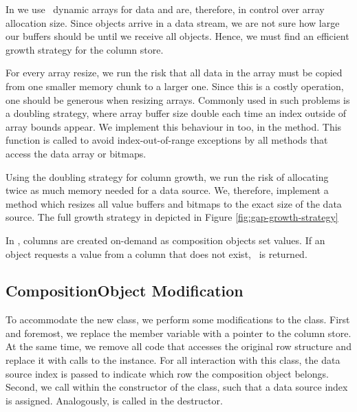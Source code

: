 In  we use \delphi~dynamic arrays for data and are, therefore, in control over array allocation size. Since objects arrive in a data stream, we are not sure how large our buffers should be until we receive all objects. Hence, we must find an efficient growth strategy for the column store.

For every array resize, we run the risk that all data in the array must be copied from one smaller memory chunk to a larger one. Since this is a costly operation, one should be generous when resizing arrays. Commonly used in such problems is a doubling strategy, where array buffer size double each time an index outside of array bounds appear. We implement this behaviour in  too, in the  method. This function is called to avoid index-out-of-range exceptions by all methods that access the data array or bitmaps.

Using the doubling strategy for column growth, we run the risk of allocating twice as much memory needed for a data source. We, therefore, implement a  method which resizes all value buffers and bitmaps to the exact size of the data source. The full growth strategy in depicted in Figure \ref{fig:gap-growth-strategy}

In , columns are created on-demand as composition objects set values. If an object requests a value from a column that does not exist, \nil~is returned.

\subsection{CompositionObject Modification}
\label{sub:CompositionObject Modification}
To accommodate the new  class, we perform some modifications to the  class. First and foremost, we replace the  member variable with a pointer to the column store. At the same time, we remove all code that accesses the original row structure and replace it with calls to the  instance. For all interaction with this class, the data source index is passed to indicate which row the composition object belongs. Second, we call  within the constructor of the  class, such that a data source index is assigned. Analogously,  is called in the destructor.


